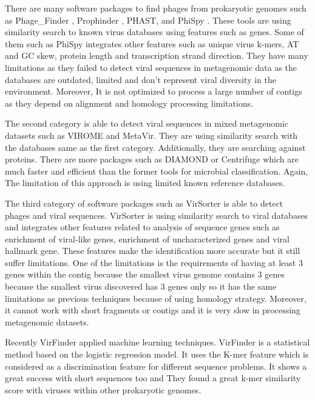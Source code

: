 \documentclass[conference]{IEEEtran}
\begin{document}
There are many software packages to find phages from prokaryotic genomes such as Phage\_Finder \cite{fouts2006phage_finder}, Prophinder \cite{lima2008prophinder}, PHAST\cite{zhou2011phast}, and PhiSpy \cite{akhter2012phispy}. These tools are using similarity search to known virus databases using features such as genes. Some of them such as PhiSpy integrates other features such as  unique virus k-mers, AT and GC skew, protein length and transcription strand direction. They have many limitations as they failed to detect viral sequences in metagenomic data as the databases are outdated, limited and don't represent viral diversity in the environment. Moreover, It is not optimized to process a large number of contigs \cite{roux2015virsorter} as they depend on alignment and homology processing limitations. 

The second category is able to detect viral sequences in mixed metagenomic datasets such as VIROME \cite{wommack2012virome} and MetaVir\cite{roux2011metavir}. They are using similarity search with the databases same as the first category. Additionally, they are searching against proteins. There are more packages such as DIAMOND \cite{buchfink2014Diamond} or Centrifuge \cite{kim2016centrifuge} which are much faster and efficient than the former tools for microbial classification. Again, The limitation of this approach is using limited known reference databases. 

The third category of software packages such as VirSorter \cite{} \cite{roux2015virsorter} is able to detect phages and viral sequences. VirSorter is using similarity search to viral databases and integrates other features related to analysis of sequence genes such as enrichment of viral-like genes, enrichment of uncharacterized genes and viral hallmark gene. These features make the identification more accurate but it still suffer limitations. One of the limitations is the requirements of having at least 3 genes within the contig because the smallest virus genome contains 3 genes because the smallest virus discovered has 3 genes only so it has the same limitations as previous techniques because of using homology strategy. Moreover, it cannot work with short fragments or contigs and it is very slow in processing metagenomic datasets. 

Recently VirFinder \cite{ren2017virfinder} applied machine learning techniques. VirFinder is a statistical method based on the logistic regression model. It uses the K-mer feature which is considered as a discrimination feature for different sequence problems. It shows a great success with short sequences too and They found a great k-mer similarity score with viruses within other prokaryotic genomes. 
\end{document}
